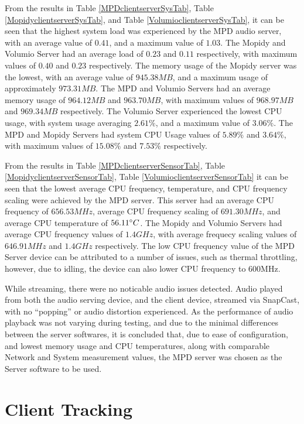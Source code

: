 \documentclass[11pt,a4paper,headinclude=false,footinclude=false]{scrreprt}
\begin{document}
From the results in Table \ref{MPDclientserverSysTab}, Table
\ref{MopidyclientserverSysTab}, and Table
\ref{VolumioclientserverSysTab}, it can be seen that the highest system
load was experienced by the MPD audio server, with an average value of
\(0.41\), and a maximum value of \(1.03\). The Mopidy and Volumio Server
had an average load of \(0.23\) and \(0.11\) respectively, with maximum
values of \(0.40\) and \(0.23\) respectively. The memory usage of the
Mopidy server was the lowest, with an average value of \(945.38MB\), and
a maximum usage of approximately \(973.31MB\). The MPD and Volumio
Servers had an average memory usage of \(964.12MB\) and \(963.70MB\),
with maximum values of \(968.97MB\) and \(969.34MB\) respectively. The
Volumio Server experienced the lowest CPU usage, with system usage
averaging \(2.61\%\), and a maximum value of \(3.06\%\). The MPD and
Mopidy Servers had system CPU Usage values of \(5.89\%\) and \(3.64\%\),
with maximum values of \(15.08\%\) and \(7.53\%\) respectively.

From the results in Table \ref{MPDclientserverSensorTab}, Table
\ref{MopidyclientserverSensorTab}, Table
\ref{VolumioclientserverSensorTab} it can be seen that the lowest
average CPU frequency, temperature, and CPU frequency scaling were
achieved by the MPD server. This server had an average CPU frequency of
\(656.53MHz\), average CPU frequency scaling of \(691.30MHz\), and
average CPU temperature of \(56.11 \degree C\). The Mopidy and Volumio
Servers had average CPU frequency values of \(1.4GHz\), with average
frequecy scaling values of \(646.91MHz\) and \(1.4GHz\) respectively.
The low CPU frequency value of the MPD Server device can be attributed
to a number of issues, such as thermal throttling, however, due to
idling, the device can also lower CPU frequency to 600MHz\cite{RPiFreq}.

While streaming, there were no noticable audio issues detected. Audio
played from both the audio serving device, and the client device,
streamed via SnapCast, with no ``popping'' or audio distortion
experienced. As the performance of audio playback was not varying during
testing, and due to the minimal differences between the server
softwares, it is concluded that, due to ease of configuration, and
lowest memory usage and CPU temperatures, along with comparable Network
and System measurement values, the MPD server was chosen as the Server
software to be used.

\section{\texorpdfstring{Client Tracking
\label{clienttrackresults}}{Client Tracking }}\label{client-tracking-2}
\end{document}

